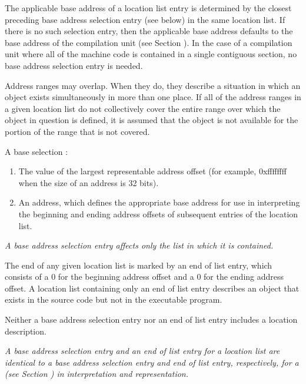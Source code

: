 The applicable base address of a 
location list entry is
determined by the closest preceding base address selection
entry (see below) in the same location list. If there is
no such selection entry, then the applicable base address
defaults to the base address of the compilation unit (see
Section ).  
In the case of a compilation unit where all of
the machine code is contained in a single contiguous section,
no base address selection entry is needed.

Address ranges may overlap. When they do, they describe a
situation in which an object exists simultaneously in more than
one place. If all of the address ranges in a given location
list do not collectively cover the entire range over which the
object in question is defined, it is assumed that the object is
not available for the portion of the range that is not covered.

A base 
selection 
:
\begin{enumerate}[1]
\item The value of the largest representable 
address offset (for example, 0xffffffff when the size of
an address is 32 bits).
\item An address, which defines the 
appropriate base address for use in interpreting the beginning
and ending address offsets of subsequent entries of the location list.
\end{enumerate}


\textit{A base address selection entry 
affects only the list in which it is contained.}

The end of any given location list is marked by an 
end of list entry, which consists of a 0 for the beginning address
offset and a 0 for the ending address offset. A location list
containing only an 
end of list entry describes an object that
exists in the source code but not in the executable program.

Neither a base address selection entry nor an end of list
entry includes a location description.

\textit{A base address selection entry and an end of list
entry for a location list are identical to a base address
selection entry and end of list entry, respectively, for a
(see Section ) 
in interpretation
and representation.}






